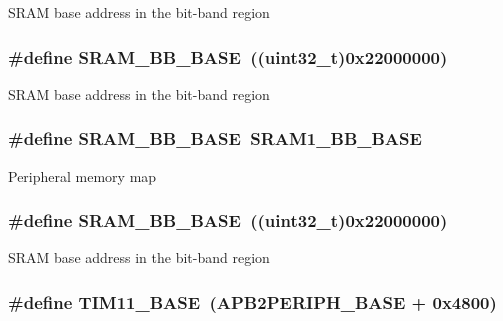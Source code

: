 S\-R\-A\-M base address in the bit-\/band region \hypertarget{group___peripheral__memory__map_gad3548b6e2f017f39d399358f3ac98454}{
\subsubsection[{S\-R\-A\-M\-\_\-\-B\-B\-\_\-\-B\-A\-S\-E}]{\setlength{\rightskip}{0pt plus 5cm}\#define S\-R\-A\-M\-\_\-\-B\-B\-\_\-\-B\-A\-S\-E~((uint32\-\_\-t)0x22000000)}}\label{group___peripheral__memory__map_gad3548b6e2f017f39d399358f3ac98454}
S\-R\-A\-M base address in the bit-\/band region \hypertarget{group___peripheral__memory__map_gad3548b6e2f017f39d399358f3ac98454}{
\subsubsection[{S\-R\-A\-M\-\_\-\-B\-B\-\_\-\-B\-A\-S\-E}]{\setlength{\rightskip}{0pt plus 5cm}\#define S\-R\-A\-M\-\_\-\-B\-B\-\_\-\-B\-A\-S\-E~{\bf S\-R\-A\-M1\-\_\-\-B\-B\-\_\-\-B\-A\-S\-E}}}\label{group___peripheral__memory__map_gad3548b6e2f017f39d399358f3ac98454}
Peripheral memory map \hypertarget{group___peripheral__memory__map_gad3548b6e2f017f39d399358f3ac98454}{
\subsubsection[{S\-R\-A\-M\-\_\-\-B\-B\-\_\-\-B\-A\-S\-E}]{\setlength{\rightskip}{0pt plus 5cm}\#define S\-R\-A\-M\-\_\-\-B\-B\-\_\-\-B\-A\-S\-E~((uint32\-\_\-t)0x22000000)}}\label{group___peripheral__memory__map_gad3548b6e2f017f39d399358f3ac98454}
S\-R\-A\-M base address in the bit-\/band region \hypertarget{group___peripheral__memory__map_ga3a4a06bb84c703084f0509e105ffaf1d}{
\subsubsection[{T\-I\-M11\-\_\-\-B\-A\-S\-E}]{\setlength{\rightskip}{0pt plus 5cm}\#define T\-I\-M11\-\_\-\-B\-A\-S\-E~(A\-P\-B2\-P\-E\-R\-I\-P\-H\-\_\-\-B\-A\-S\-E + 0x4800)}}\label{group___peripheral__memory__map_ga3a4a06bb84c703084f0509e105ffaf1d}
